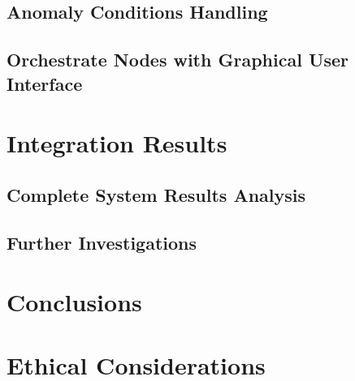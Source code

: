 \documentclass[11pt]{report} %
\begin{document}
\section{Anomaly Conditions Handling}

\section{Orchestrate Nodes with Graphical User Interface}

\chapter{Integration Results}

\section{Complete System Results Analysis}

\section{Further Investigations}

\chapter{Conclusions}

\chapter{Ethical Considerations}



\begin{sloppypar}
    
    
\end{sloppypar}
\end{document}
